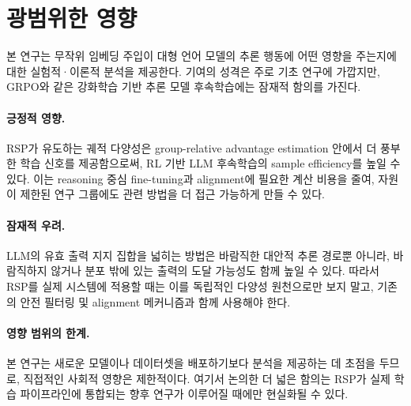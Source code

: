 \clearpage
\section{광범위한 영향}\label{app:broader_impacts}

본 연구는 무작위 임베딩 주입이 대형 언어 모델의 추론 행동에 어떤 영향을 주는지에 대한 실험적·이론적 분석을 제공한다. 기여의 성격은 주로 기초 연구에 가깝지만, GRPO와 같은 강화학습 기반 추론 모델 후속학습에는 잠재적 함의를 가진다.

\paragraph{긍정적 영향.}
RSP가 유도하는 궤적 다양성은 group-relative advantage estimation 안에서 더 풍부한 학습 신호를 제공함으로써, RL 기반 LLM 후속학습의 sample efficiency를 높일 수 있다. 이는 reasoning 중심 fine-tuning과 alignment에 필요한 계산 비용을 줄여, 자원이 제한된 연구 그룹에도 관련 방법을 더 접근 가능하게 만들 수 있다.

\paragraph{잠재적 우려.}
LLM의 유효 출력 지지 집합을 넓히는 방법은 바람직한 대안적 추론 경로뿐 아니라, 바람직하지 않거나 분포 밖에 있는 출력의 도달 가능성도 함께 높일 수 있다. 따라서 RSP를 실제 시스템에 적용할 때는 이를 독립적인 다양성 원천으로만 보지 말고, 기존의 안전 필터링 및 alignment 메커니즘과 함께 사용해야 한다.

\paragraph{영향 범위의 한계.}
본 연구는 새로운 모델이나 데이터셋을 배포하기보다 분석을 제공하는 데 초점을 두므로, 직접적인 사회적 영향은 제한적이다. 여기서 논의한 더 넓은 함의는 RSP가 실제 학습 파이프라인에 통합되는 향후 연구가 이루어질 때에만 현실화될 수 있다.
